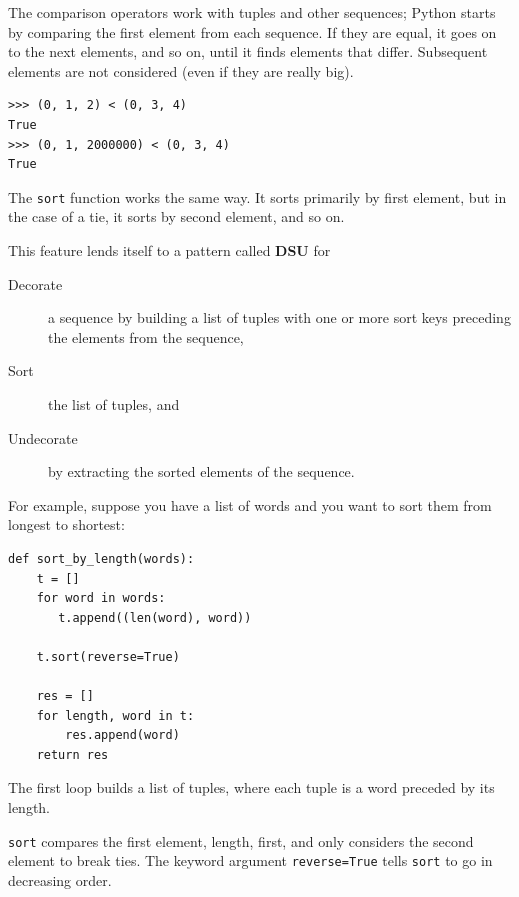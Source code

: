 \documentclass[10pt]{book}
\begin{document}
The comparison operators work with tuples and other sequences;
Python starts by comparing the first element from each
sequence.  If they are equal, it goes on to the next elements,
and so on, until it finds elements that differ.  Subsequent
elements are not considered (even if they are really big).

\beforeverb
\begin{verbatim}
>>> (0, 1, 2) < (0, 3, 4)
True
>>> (0, 1, 2000000) < (0, 3, 4)
True
\end{verbatim}
\afterverb
%
The {\tt sort} function works the same way.  It sorts 
primarily by first element, but in the case of a tie, it sorts
by second element, and so on.  

This feature lends itself to a pattern called {\bf DSU} for 

\begin{description}

\item[Decorate] a sequence by building a list of tuples
with one or more sort keys preceding the elements from the sequence,

\item[Sort] the list of tuples, and

\item[Undecorate] by extracting the sorted elements of the sequence.

\end{description}

\label{DSU}

For example, suppose you have a list of words and you want to
sort them from longest to shortest:

\beforeverb
\begin{verbatim}
def sort_by_length(words):
    t = []
    for word in words:
       t.append((len(word), word))

    t.sort(reverse=True)

    res = []
    for length, word in t:
        res.append(word)
    return res
\end{verbatim}
\afterverb
%
The first loop builds a list of tuples, where each
tuple is a word preceded by its length.

{\tt sort} compares the first element, length, first, and
only considers the second element to break ties.  The keyword argument
{\tt reverse=True} tells {\tt sort} to go in decreasing order.
\end{document}
